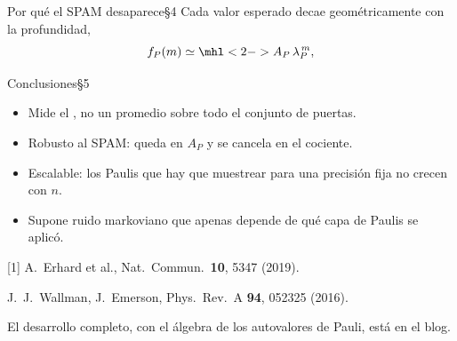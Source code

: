 \documentclass[12pt]{beamer}
\begin{document}
\begin{frame}{Por qué el SPAM desaparece}{\S4}
Cada valor esperado decae geométricamente con la profundidad,
\begin{equation}
  f_P(m) \simeq \mhl<2->{A_P}\,\lambda_P^{\,m},
\end{equation}
\end{frame}

\begin{frame}{Conclusiones}{\S5}
\begin{itemize}
  \item Mide el , no un promedio sobre
        todo el conjunto de puertas.
  \item Robusto al SPAM: queda en $A_P$ y se cancela en el cociente.
  \item Escalable: los Paulis que hay que muestrear para una precisión
        fija no crecen con $n$.
  \item Supone ruido markoviano que apenas depende de qué capa de Paulis
        se aplicó.
\end{itemize}
\vspace{1mm}
{\footnotesize\color{igMuted}
[1] A.~Erhard et al., Nat.\ Commun.\ \textbf{10}, 5347 (2019).\par
[2] J.~J.~Wallman, J.~Emerson, Phys.\ Rev.\ A \textbf{94}, 052325 (2016).\par}
\end{frame}

  {El desarrollo completo, con el álgebra de los autovalores de Pauli,
   está en el blog.}
\end{document}
